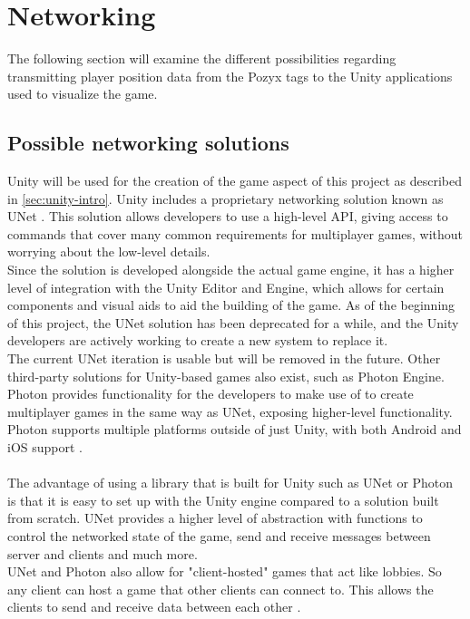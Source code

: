 \section{Networking}\label{sec:sprint1-networking}
The following section will examine the different possibilities regarding transmitting player position data from the Pozyx tags to the Unity applications used to visualize the game.

\subsection{Possible networking solutions}
Unity will be used for the creation of the game aspect of this project as described in \autoref{sec:unity-intro}.
Unity includes a proprietary networking solution known as UNet \cite{unityunet}.
This solution allows developers to use a high-level API, giving access to commands that cover many common requirements for multiplayer games, without worrying about the low-level details. \\
Since the solution is developed alongside the actual game engine, it has a higher level of integration with the Unity Editor and Engine, which allows for certain components and visual aids to aid the building of the game.
As of the beginning of this project, the UNet solution has been deprecated for a while, and the Unity developers are actively working to create a new system to replace it. \\
The current UNet iteration is usable but will be removed in the future.
Other third-party solutions for Unity-based games also exist, such as Photon Engine.
Photon provides functionality for the developers to make use of to create multiplayer games in the same way as UNet, exposing higher-level functionality.
Photon supports multiple platforms outside of just Unity, with both Android and iOS support \cite{photonnet}.
\\\\
The advantage of using a library that is built for Unity such as UNet or Photon is that it is easy to set up with the Unity engine compared to a solution built from scratch.
UNet provides a higher level of abstraction with functions to control the networked state of the game, send and receive messages between server and clients and much more.\\
UNet and Photon also allow for "client-hosted" games that act like lobbies.
So any client can host a game that other clients can connect to.
This allows the clients to send and receive data between each other \cite{unityunet}.
